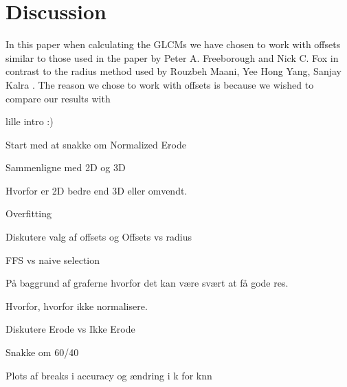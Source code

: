 \chapter{Discussion}

In this paper when calculating the GLCMs we have chosen to work with offsets similar to those used in the paper by Peter A. Freeborough and Nick C. Fox \cite{MRfreeborough} in contrast to the radius method used by Rouzbeh Maani, Yee Hong Yang, Sanjay Kalra \cite{Voxel}.
The reason we chose to work with offsets is because we wished to compare our results with \cite{MRfreeborough}


lille intro :)

Start med at snakke om Normalized Erode

Sammenligne med 2D og 3D

Hvorfor er 2D bedre end 3D eller omvendt.

Overfitting

Diskutere valg af offsets og Offsets vs radius

FFS vs naive selection

På baggrund af graferne hvorfor det kan være svært at få gode res.

Hvorfor, hvorfor ikke normalisere.

Diskutere Erode vs Ikke Erode

Snakke om 60/40

Plots af breaks i accuracy og ændring i k for knn 